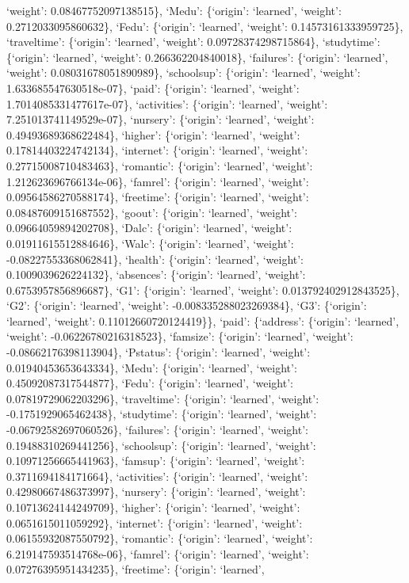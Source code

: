 \documentclass[
]{article}
\begin{document}
`weight': 0.08467752097138515\}, `Medu': \{`origin': `learned',
`weight': 0.2712033095860632\}, `Fedu': \{`origin': `learned', `weight':
0.14573161333959725\}, `traveltime': \{`origin': `learned', `weight':
0.09728374298715864\}, `studytime': \{`origin': `learned', `weight':
0.266362204840018\}, `failures': \{`origin': `learned', `weight':
0.08031678051890989\}, `schoolsup': \{`origin': `learned', `weight':
1.633685547630518e-07\}, `paid': \{`origin': `learned', `weight':
1.7014085331477617e-07\}, `activities': \{`origin': `learned', `weight':
7.251013741149529e-07\}, `nursery': \{`origin': `learned', `weight':
0.49493689368622484\}, `higher': \{`origin': `learned', `weight':
0.17814403224742134\}, `internet': \{`origin': `learned', `weight':
0.27715008710483463\}, `romantic': \{`origin': `learned', `weight':
1.212623696766134e-06\}, `famrel': \{`origin': `learned', `weight':
0.09564586270588174\}, `freetime': \{`origin': `learned', `weight':
0.08487609151687552\}, `goout': \{`origin': `learned', `weight':
0.09664059894202708\}, `Dalc': \{`origin': `learned', `weight':
0.01911615512884646\}, `Walc': \{`origin': `learned', `weight':
-0.08227553368062841\}, `health': \{`origin': `learned', `weight':
0.1009039626224132\}, `absences': \{`origin': `learned', `weight':
0.6753957856896687\}, `G1': \{`origin': `learned', `weight':
0.013792402912843525\}, `G2': \{`origin': `learned', `weight':
-0.008335288023269384\}, `G3': \{`origin': `learned', `weight':
0.11012660720124419\}\}, `paid': \{`address': \{`origin': `learned',
`weight': -0.06226780216318523\}, `famsize': \{`origin': `learned',
`weight': -0.08662176398113904\}, `Pstatus': \{`origin': `learned',
`weight': 0.01940453653643334\}, `Medu': \{`origin': `learned',
`weight': 0.45092087317544877\}, `Fedu': \{`origin': `learned',
`weight': 0.07819729062203296\}, `traveltime': \{`origin': `learned',
`weight': -0.1751929065462438\}, `studytime': \{`origin': `learned',
`weight': -0.06792582697060526\}, `failures': \{`origin': `learned',
`weight': 0.19488310269441256\}, `schoolsup': \{`origin': `learned',
`weight': 0.10971256665441963\}, `famsup': \{`origin': `learned',
`weight': 0.3711694184171664\}, `activities': \{`origin': `learned',
`weight': 0.42980667486373997\}, `nursery': \{`origin': `learned',
`weight': 0.10713624144249709\}, `higher': \{`origin': `learned',
`weight': 0.0651615011059292\}, `internet': \{`origin': `learned',
`weight': 0.06155932087550792\}, `romantic': \{`origin': `learned',
`weight': 6.219147593514768e-06\}, `famrel': \{`origin': `learned',
`weight': 0.07276395951434235\}, `freetime': \{`origin': `learned',
\end{document}
